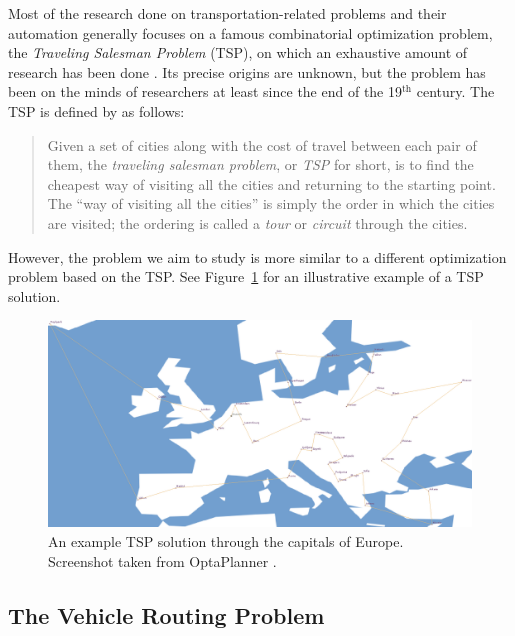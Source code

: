 Most of the research done on transportation-related problems and their automation
generally focuses
on a famous combinatorial optimization problem, the \textit{Traveling Salesman Problem} (TSP), on which an
exhaustive amount of research has been done \citep{Applegate1998, Applegate2011}. Its precise origins are unknown, but the problem has been on the minds of researchers at least since the end of the 19$^\textrm{th}$ century. The TSP is defined by \citet{Applegate2011} as follows:
\begin{quote}
Given a set of cities along with the cost of travel between each pair of them, the \textit{traveling salesman problem}, or \textit{TSP} for short, is to find the cheapest way of visiting all the cities and returning to the starting point. The ``way of visiting all the cities'' is simply the order in which the cities are visited; the ordering is called a \textit{tour} or \textit{circuit} through the cities.
\end{quote}
However, the problem we aim to study is more similar to a different optimization problem based on the TSP. See Figure~\ref{fig:tsp} for an illustrative example of a TSP solution.

\begin{figure}[tbp]
\begin{center}
\includegraphics[width=1.0\textwidth]{../img/tsp}
\end{center}
\caption[An example TSP solution through the capitals of Europe.]{An example TSP solution through the capitals of Europe. Screenshot taken from OptaPlanner \citep{DeSmet2017}.}
\label{fig:tsp}
\end{figure}

\subsection{The Vehicle Routing Problem}\label{vrp}

